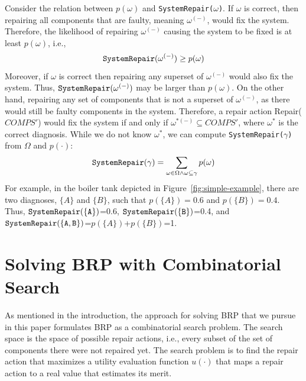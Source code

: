 \documentclass[review]{elsarticle}
\newcommand\sysrep[1]{{\tt SystemRepair(#1)}}
\newcommand{\COMPS}{\textit{COMPS}}
\begin{document}
Consider the relation between $p(\omega)$ and \sysrep{$\omega$}. If $\omega$ is correct, then repairing all components that are faulty, meaning $\omega^{(-)}$, would fix the system. Therefore, the likelihood of repairing $\omega^{(-)}$ causing the system to be fixed is at least $p(\omega)$, i.e.,
\[ \sysrep{\omega^{(-)}}\geq p(\omega)  \]
Moreover, if $\omega$ is correct then repairing any superset of $\omega^{(-)}$ would also fix the system. Thus, $\sysrep{\omega^{(-)}}$ may be larger than $p(\omega)$.
On the other hand, repairing any set of components that is not a superset of $\omega^{(-)}$, as there would still be faulty components in the system.
Therefore, a repair action Repair($\COMPS '$) would fix the system if and only if $\omega^{*{(-)}}\subseteq \COMPS '$, where $\omega^*$ is the correct diagnosis.
While we do not know $\omega^*$, we can compute \sysrep{$\gamma$} from $\Omega$ and $p(\cdot)$:
\[ \sysrep{\gamma} = \sum_{\omega\in \Omega \wedge \omega\subseteq \gamma} p(\omega) \]
For example, in the boiler tank depicted in Figure~\ref{fig:simple-example}, there are two diagnoses, $\{A\}$ and $\{B\}$, such that $p(\{A\})=0.6$ and $p(\{B\})=0.4$. Thus, $\sysrep{\{A\}}$=0.6, $\sysrep{\{B\}}$=0.4, and $\sysrep{\{A,B\}}$=$p(\{A\})$+$p(\{B\})$=1.


%
%
%
%



\section{Solving BRP with Combinatorial Search}
As mentioned in the introduction, the approach for solving BRP that we pursue in this paper formulates BRP as a combinatorial search problem. The search space is the space of possible repair actions, i.e., every subset of the set of components there were not repaired yet.
The search problem is to find the repair action that maximizes a utility evaluation function $u(\cdot)$ that maps a repair action to a real value that estimates its merit.
\end{document}
